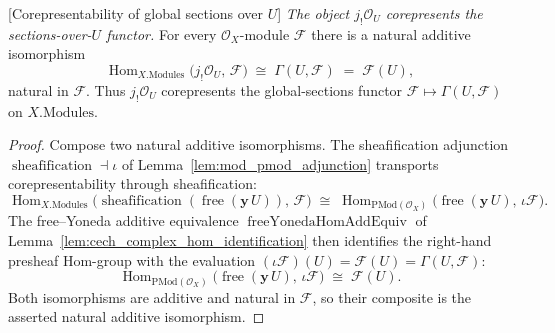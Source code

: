 \begin{lemma}

[Corepresentability of global sections over \(U\)]
  \label{lem:jshriek_corepr}
  \textit{The object \(j_!\mathcal{O}_U\) corepresents the sections-over-\(U\) functor.}
  For every \(\mathcal{O}_X\)-module \(\mathcal{F}\) there is a natural additive
  isomorphism
  \[
    \operatorname{Hom}_{X.\mathrm{Modules}}\bigl(j_!\mathcal{O}_U,\, \mathcal{F}\bigr)
    \;\cong\;
    \Gamma(U, \mathcal{F}) \;=\; \mathcal{F}(U),
  \]
  natural in \(\mathcal{F}\). Thus \(j_!\mathcal{O}_U\) corepresents the global-sections
  functor \(\mathcal{F} \mapsto \Gamma(U, \mathcal{F})\) on \(X.\mathrm{Modules}\).
\end{lemma}

\begin{proof}
  Compose two natural additive isomorphisms. The sheafification adjunction
  \(\operatorname{sheafification} \dashv \iota\) of
  Lemma~\ref{lem:mod_pmod_adjunction} transports corepresentability through
  sheafification:
  \[
    \operatorname{Hom}_{X.\mathrm{Modules}}\bigl(
      \operatorname{sheafification}(\operatorname{free}(\mathbf{y}\,U)),\, \mathcal{F}
    \bigr)
    \;\cong\;
    \operatorname{Hom}_{\mathrm{PMod}(\mathcal{O}_X)}\bigl(
      \operatorname{free}(\mathbf{y}\,U),\, \iota\mathcal{F}\bigr).
  \]
  The free–Yoneda additive equivalence \(\operatorname{freeYonedaHomAddEquiv}\) of
  Lemma~\ref{lem:cech_complex_hom_identification} then identifies the right-hand
  presheaf Hom-group with the evaluation \((\iota\mathcal{F})(U) = \mathcal{F}(U) =
  \Gamma(U, \mathcal{F})\):
  \[
    \operatorname{Hom}_{\mathrm{PMod}(\mathcal{O}_X)}\bigl(
      \operatorname{free}(\mathbf{y}\,U),\, \iota\mathcal{F}\bigr)
    \;\cong\;
    \mathcal{F}(U).
  \]
  Both isomorphisms are additive and natural in \(\mathcal{F}\), so their composite is
  the asserted natural additive isomorphism.
\end{proof}

